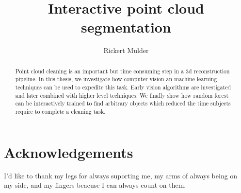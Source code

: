 \documentclass[a4paper,11pt]{report}
\begin{document}
\listoftodos



\pagestyle{plain} %

\thispagestyle{empty}
\title{Interactive point cloud segmentation}
\author{Rickert Mulder}
\maketitle

\tableofcontents
\listoffigures

\newpage
\chapter*{Acknowledgements}
I'd like to thank my legs for always suporting me, my arms of always being on my side, and my fingers beacuse I can always count on them.

\listoftables


\begin{abstract}
Point cloud cleaning is an important but time consuming step in a 3d reconstruction pipeline. In this thesis, we investigate how computer vision an machine learning techniques can be used to expedite this task. Early vision algorithms are investigated and later combined with higher level techniques. We finally show how random forest can be interactively trained to find arbitrary objects which reduced the time subjects require to complete a cleaning task.
\end{abstract}

\clearpage
{}


% 
% 
% 
% 

% 



\end{document}
